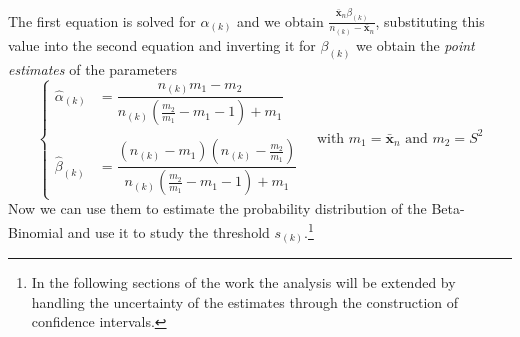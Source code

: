 \documentclass[10pt]{article} %
\begin{document}
The first equation is solved for $\alpha_{(k)}$ and we obtain $\frac{\bar{\mathbf{x}}_{n}\beta_{(k)}}{n_{(k)}-\bar{\mathbf{x}}_{n}}$, substituting this value into the second equation and inverting it for $\beta_{(k)}$ we obtain the \textit{point estimates} of the parameters
\begin{equation}\label{stime parametri}
    \begin{cases}
        \hat\alpha_{(k)} &= \dfrac{n_{(k)}m_{1}-m_{2}}{n_{(k)}(\frac{m_{2}}{m_{1}}-{m_{1}} -1)+m_{1}}\\ \\
        \hat\beta_{(k)} &= \dfrac{(n_{(k)}-m_{1})(n_{(k)}-\frac{m_{2}}{m_{1}})}{n_{(k)}(\frac{m_{2}}{m_{1}}-m_{1} -1)+m_{1}}
    \end{cases} \quad \mbox{with } m_{1} = \bar{\mathbf{x}}_{n}\mbox{ and } m_{2} = S^{2}
\end{equation}
Now we can use them to estimate the probability distribution of the Beta-Binomial and use it to study the threshold $s_{(k)}$.\footnote{In the following sections of the work the analysis will be extended by handling the uncertainty of the estimates through the construction of confidence intervals.}
\end{document}

